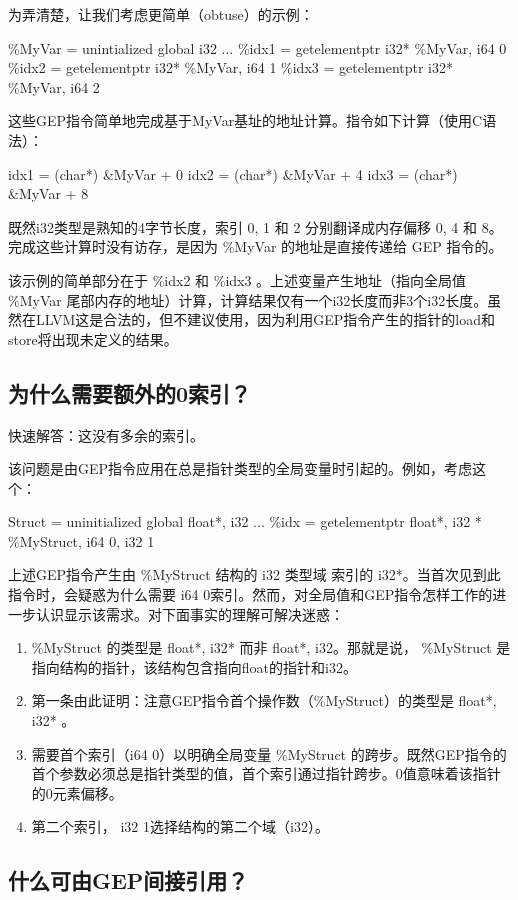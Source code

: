 \documentclass[12pt,a4paper]{article}
\begin{document}
为弄清楚，让我们考虑更简单（obtuse）的示例：

\%MyVar = unintialized global i32
...
\%idx1 = getelementptr i32* \%MyVar, i64 0
\%idx2 = getelementptr i32* \%MyVar, i64 1
\%idx3 = getelementptr i32* \%MyVar, i64 2

这些GEP指令简单地完成基于MyVar基址的地址计算。指令如下计算（使用C语法）：

idx1 = (char*) \&MyVar + 0
idx2 = (char*) \&MyVar + 4
idx3 = (char*) \&MyVar + 8

既然i32类型是熟知的4字节长度，索引 0, 1 和 2 分别翻译成内存偏移 0, 4 和 8。完成这些计算时没有访存，是因为 \%MyVar 的地址是直接传递给 GEP 指令的。

该示例的简单部分在于 \%idx2 和 \%idx3 。上述变量产生地址（指向全局值 \%MyVar 尾部内存的地址）计算，计算结果仅有一个i32长度而非3个i32长度。虽然在LLVM这是合法的，但不建议使用，因为利用GEP指令产生的指针的load和store将出现未定义的结果。

\subsection{为什么需要额外的0索引？}

快速解答：这没有多余的索引。

该问题是由GEP指令应用在总是指针类型的全局变量时引起的。例如，考虑这个：

Struct = uninitialized global { float*, i32 }
...
\%idx = getelementptr { float*, i32 }* \%MyStruct, i64 0, i32 1

上述GEP指令产生由 \%MyStruct 结构的 i32 类型域 索引的 i32*。当首次见到此指令时，会疑惑为什么需要 i64 0索引。然而，对全局值和GEP指令怎样工作的进一步认识显示该需求。对下面事实的理解可解决迷惑：

\begin{enumerate}
\item \%MyStruct 的类型是 { float*, i32}* 而非 { float*, i32}。那就是说， \%MyStruct 是指向结构的指针，该结构包含指向float的指针和i32。
\item 第一条由此证明：注意GEP指令首个操作数（\%MyStruct）的类型是 {float*, i32}* 。
\item 需要首个索引（i64 0）以明确全局变量 \%MyStruct 的跨步。既然GEP指令的首个参数必须总是指针类型的值，首个索引通过指针跨步。0值意味着该指针的0元素偏移。
\item 第二个索引， i32 1选择结构的第二个域（i32）。
\end{enumerate}

\subsection{什么可由GEP间接引用？}
\end{document}
